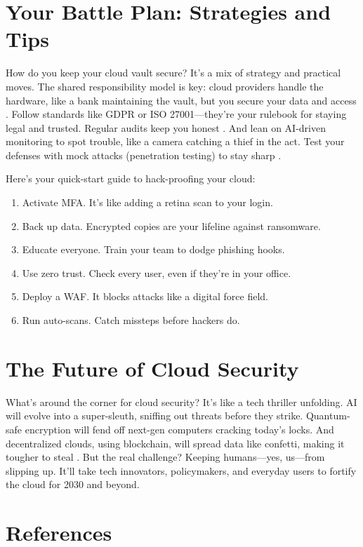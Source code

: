 \documentclass[a4paper,10pt,twocolumn]{memoir}
\begin{document}
\section*{Your Battle Plan: Strategies and Tips}

How do you keep your cloud vault secure? It’s a mix of strategy and practical moves. The shared responsibility model is key: cloud providers handle the hardware, like a bank maintaining the vault, but you secure your data and access \cite{csrc2024}. Follow standards like GDPR or ISO 27001—they’re your rulebook for staying legal and trusted. Regular audits keep you honest \cite{apisec2025}. And lean on AI-driven monitoring to spot trouble, like a camera catching a thief in the act. Test your defenses with mock attacks (penetration testing) to stay sharp \cite{cloudsec2025}.

Here’s your quick-start guide to hack-proofing your cloud:
\begin{enumerate}
    \item Activate MFA. It’s like adding a retina scan to your login.
    \item Back up data. Encrypted copies are your lifeline against ransomware.
    \item Educate everyone. Train your team to dodge phishing hooks.
    \item Use zero trust. Check every user, even if they’re in your office.
    \item Deploy a WAF. It blocks attacks like a digital force field.
    \item Run auto-scans. Catch missteps before hackers do.
\end{enumerate}

\section*{The Future of Cloud Security}

What’s around the corner for cloud security? It’s like a tech thriller unfolding. AI will evolve into a super-sleuth, sniffing out threats before they strike. Quantum-safe encryption will fend off next-gen computers cracking today’s locks. And decentralized clouds, using blockchain, will spread data like confetti, making it tougher to steal \cite{cloudsec2025}. But the real challenge? Keeping humans—yes, us—from slipping up. It’ll take tech innovators, policymakers, and everyday users to fortify the cloud for 2030 and beyond.

\section*{References}
\end{document}
